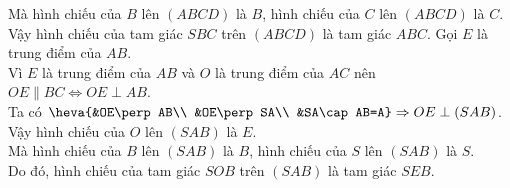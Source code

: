 \begin{ex}
{\begin{itemchoice}
			Mà hình chiếu của $B$ lên $(ABCD)$ là $B$,  hình chiếu của $C$ lên $(ABCD)$ là $C$. \\
			Vậy  hình chiếu của tam giác $SBC$ trên $(ABCD)$ là tam giác $ABC$.
			\itemch 
			Gọi $E$ là trung điểm  của $AB$. \\
			Vì $E$  là trung điểm của $AB$ và $O$ là trung điểm của $AC$ nên $OE\parallel BC\Leftrightarrow OE\perp AB$. \\
			 Ta có $\heva{&OE\perp AB\\
			 &OE\perp SA\\
			&SA\cap AB=A} \Rightarrow OE\perp (SAB)$. \\ 
			Vậy hình  chiếu của $O$ lên $(SAB)$ là $E$. \\
			Mà hình chiếu của $B$ lên $(SAB)$ là $B$, hình  chiếu của $S$ lên $(SAB)$ là $S$. \\
			Do đó, hình chiếu của tam giác $SOB$ trên $(SAB)$ là tam giác  $SEB$.
		\end{itemchoice}
	 }
\end{ex}

